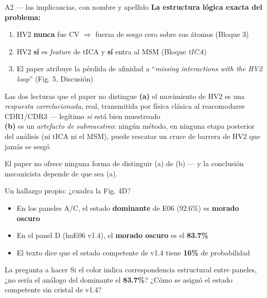 \documentclass[aspectratio=169,11pt]{beamer}
\begin{document}
\begin{frame}{A2 — las implicancias, con nombre y apellido}
  \textbf{La estructura lógica exacta del problema:}
  \begin{enumerate}
    \setlength{\itemsep}{0.5em}
    \item HV2 \textbf{nunca} fue CV $\Rightarrow$ fuerza de sesgo cero sobre sus átomos (Bloque 3)
    \item HV2 \textbf{sí} es \textit{feature} de tICA y \textbf{sí} entra al MSM (Bloque \textit{tICA})
    \item El paper atribuye la pérdida de afinidad a \alert{``\textit{missing interactions with the HV2 loop}''} (Fig. 5, Discusión)
  \end{enumerate}
  \vspace{0.5em}
  \begin{alertblock}{Las dos lecturas que el paper no distingue}
    \textbf{(a)} el movimiento de HV2 es una \emph{respuesta correlacionada}, real, transmitida por física clásica al reacomodarse CDR1/CDR3 — legítimo \emph{si} está bien muestreado\\
    \textbf{(b)} es un \emph{artefacto de submuestreo}: ningún método, en ninguna etapa posterior del análisis (ni tICA ni el MSM), puede rescatar un cruce de barrera de HV2 que jamás se sesgó
  \end{alertblock}
  \centering \alert{El paper no ofrece ninguna forma de distinguir (a) de (b) — y la conclusión mecanicista depende de que sea (a).}
\end{frame}

\begin{frame}{Un hallazgo propio: ¿cuadra la Fig. 4D?}
  \begin{itemize}
    \item En los paneles A/C, el estado \textbf{dominante} de E06 (92.6\%) es \textbf{morado oscuro}
    \item En el panel D (huE06 v1.4), el \textbf{morado oscuro} es el \textbf{83.7\%}
    \item El texto dice que el estado competente de v1.4 tiene \textbf{16\%} de probabilidad
  \end{itemize}
  \begin{alertblock}{La pregunta a hacer}
    Si el color indica correspondencia estructural entre paneles, ¿no sería el análogo del dominante el \textbf{83.7\%}? ¿Cómo se asignó el estado competente sin cristal de v1.4?
  \end{alertblock}
\end{frame}
\end{document}

